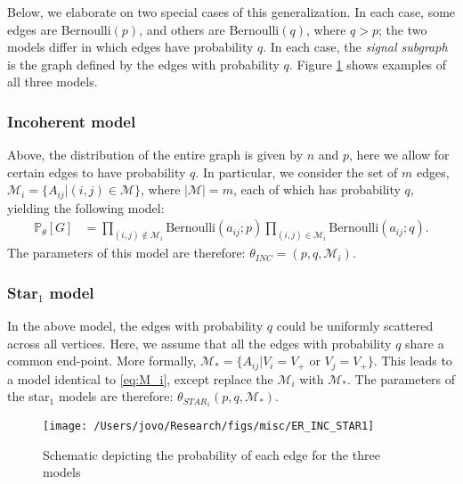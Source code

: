 \documentclass[10pt,journal,cspaper,compsoc]{IEEEtran}
\providecommand{\mc}[1]{\mathcal{#1}}
\newcommand{\PP}{\mathbb{P}}
\newcommand{\thet}{\theta}
\begin{document}
Below, we elaborate on two special cases of this generalization.  In each case, some edges are Bernoulli$(p)$, and others are Bernoulli$(q)$, where $q>p$; the two models differ in which edges have probability $q$. In each case, the \emph{signal subgraph} is the graph defined by the edges with probability $q$.  Figure \ref{fig:models} shows examples of all three models.


\subsubsection{Incoherent model} %
\label{ssub:incoherent_subspace}

Above, the distribution of the entire graph is given by $n$ and $p$, here we allow for certain edges to have probability $q$.  In particular, we consider the set of $m$ edges, $\mc{M}_i=\{A_{ij} | (i,j) \in \mc{M}\}$, where $|\mc{M}|=m$, each of which has probability $q$, yielding the following model:
\begin{align} \label{eq:M_i}
	\PP_{\thet}[G]&= \prod_{(i,j) \notin \mc{M}_i} \text{Bernoulli}(a_{ij}; p) \prod_{(i,j) \in \mc{M}_i} \text{Bernoulli}(a_{ij}; q).
\end{align}
The parameters of this model are therefore: $\thet_{INC}=(p,q,\mc{M}_i)$.




\subsubsection{Star$_1$  model} %
\label{ssub:incoherent_subspace}

In the above model, the edges with probability $q$ could be uniformly scattered across all vertices.  Here, we assume that all the edges with probability $q$ share a common end-point.  More formally, $\mc{M}_*=\{A_{ij} | V_i = V_+ \text{ or } V_j = V_+\}$.  This leads to a model identical to \eqref{eq:M_i}, except replace the $\mc{M}_i$ with $\mc{M}_*$. The parameters of the star$_1$ models are therefore: $\thet_{STAR_1}(p,q,\mc{M}_*)$.

\begin{figure}[h!]
\centering \texttt{[image: /Users/jovo/Research/figs/misc/ER\_INC\_STAR1]}
\caption{Schematic depicting the probability of each edge for the three models}
\label{fig:models}
\end{figure}

\end{document}
